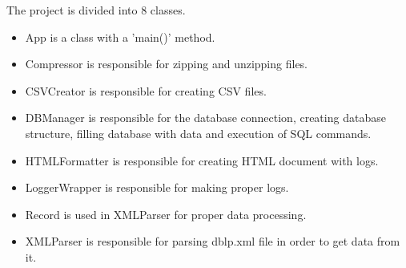 \documentclass{acm_proc_article-sp}
\begin{document}
The project is divided into 8 classes.
\begin{itemize}
	\item App is a class with a 'main()' method.
	\item Compressor is responsible for zipping and unzipping files.
	\item CSVCreator is responsible for creating CSV files.
	\item DBManager is responsible for the database connection, creating database structure, filling database with data and execution of SQL commands.
	\item HTMLFormatter is responsible for creating HTML document with logs.
	\item LoggerWrapper is responsible for making proper logs.
	\item Record is used in XMLParser for proper data processing.
	\item XMLParser is responsible for parsing dblp.xml file in order to get data from it.
\end{itemize}



\end{document}

